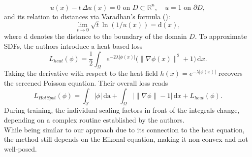 \documentclass[12pt,openany]{book}
\newcommand{\R}{\mathbb{R}}
\def\S{\mathcal{S}}
\theoremstyle{plainnormal}
\theoremstyle{remark}
\begin{document}
$$u(x) - t\,\Delta u(x) = 0 \text{ on } D\subset \R^n, \quad u = 1 \text{ on } \partial D,$$
and its relation to distances via Varadhan's formula (\cite{varadhan}):
$$
\lim_{t\rightarrow0} \sqrt{t}\ln(1/u(x)) = \mathrm{d}(x),$$ 
where $\mathrm{d}$ denotes the distance to the boundary of the domain $D$. To approximate SDFs, the authors introduce a heat-based loss $$L_{heat}(\phi) = \frac{1}{2}\int_\Omega e^{-2\lambda |\phi(x)|}\big(\|\nabla \phi(x)\|^2 + 1\big) \,\mathrm{d}x.$$ Taking the derivative with respect to the heat field $h(x) = e^{-\lambda|\phi(x)|}$ recovers the screened Poisson equation. Their overall loss reads $$L_{HotSpot}(\phi) = \int_\S |\phi|\,\mathrm{da}  + \int_\Omega \big|\|\nabla \phi\| - 1\big|\,\mathrm{d}x + L_{heat}(\phi).$$
During training, the individual scaling factors in front of the integrals change, depending on a complex routine established by the authors.\\ 
While being similar to our approach due to its connection to the heat equation, the method still depends on the Eikonal equation, making it non-convex and not well-posed.
\end{document}
